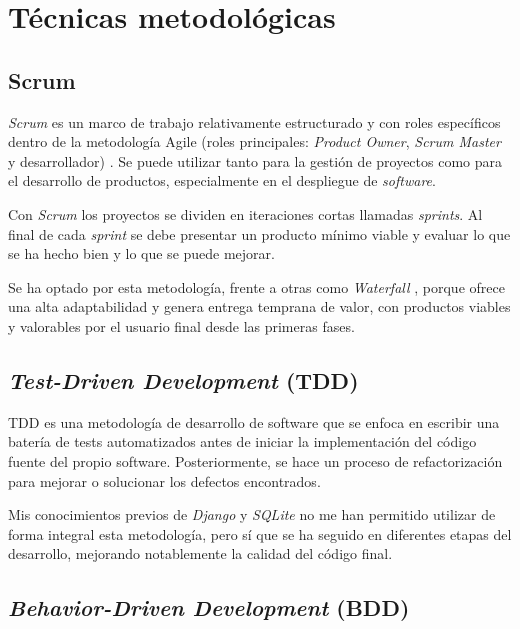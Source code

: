 
\section{Técnicas metodológicas}\label{metodologias}

\subsection{Scrum}\label{scrum}

\emph{Scrum} \citep{wiki:Scrum} es un marco de trabajo relativamente estructurado y con roles específicos 
dentro de la metodología Agile (roles principales: \emph{Product Owner}, \emph{Scrum Master} y desarrollador) . Se 
puede utilizar tanto para la gestión de proyectos como para el desarrollo de productos, especialmente 
en el despliegue de \emph{software}. 

Con \emph{Scrum} los proyectos se dividen en iteraciones cortas llamadas \emph{sprints}. Al final de cada 
\emph{sprint} se debe presentar un producto mínimo viable y evaluar lo que se ha hecho bien y lo 
que se puede mejorar. 

Se ha optado por esta metodología, frente a otras como \emph{Waterfall} \citep{wiki:waterfall} , porque ofrece una alta 
adaptabilidad y genera entrega temprana de valor, con productos viables y valorables por el usuario 
final desde las primeras fases. 

\subsection{\emph{Test-Driven Development} (TDD)}\label{test_driven_development_tdd}

TDD \citep{wiki:TDD} es una metodología de desarrollo de software que se enfoca en escribir una batería 
de tests automatizados antes de iniciar la implementación del código fuente del propio software. Posteriormente, 
se hace un proceso de refactorización para mejorar o solucionar los defectos encontrados. 

Mis conocimientos previos de \emph{Django} y \emph{SQLite} no me han permitido utilizar de forma integral 
esta metodología, pero sí que se ha seguido en diferentes etapas del desarrollo, mejorando notablemente la 
calidad del código final. 

\subsection{\emph{Behavior-Driven Development} (BDD)}\label{behavior_driven_development_bdd}

